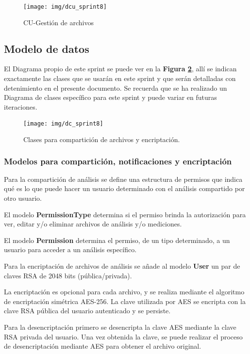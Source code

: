     \begin{figure}[h]
        \centering
        \texttt{[image: img/dcu\_sprint8]}
        \caption{CU-Gestión de archivos}
		\label{8-cu_compartición_encriptación}
    \end{figure}


\subsection{Modelo de datos}
El Diagrama propio de este sprint se puede ver en la \textbf{Figura \ref{8-clases_compartición_encriptación}}, allí se indican exactamente las clases que se usarán en este sprint y que serán detalladas con detenimiento en el presente documento. Se recuerda que se ha realizado un Diagrama de clases específico para este sprint y puede variar en futuras iteraciones.

    \begin{figure}[h]
        \centering
        \texttt{[image: img/dc\_sprint8]}
        \caption{Clases para compartición de archivos y encriptación.}
		\label{8-clases_compartición_encriptación}
    \end{figure}

\subsubsection{Modelos para compartición, notificaciones y encriptación}

Para la compartición de análisis se define una estructura de permisos que indica qué es lo que puede hacer un usuario determinado con el análisis compartido por otro usuario.

El modelo \textbf{PermissionType} determina si el permiso brinda la autorización para ver, editar y/o eliminar archivos de análisis y/o mediciones.

El modelo \textbf{Permission} determina el permiso, de un tipo determinado, a un usuario para acceder a un análisis específico.

Para la encriptación de archivos de análisis se añade al modelo \textbf{User} un par de claves RSA de 2048 bits (pública/privada).

La encriptación es opcional para cada archivo, y se realiza mediante el algoritmo de encriptación simétrica AES-256. La clave utilizada por AES se encripta con la clave RSA pública del usuario autenticado y se persiste.

Para la desencriptación primero se desencripta la clave AES mediante la clave RSA privada del usuario. Una vez obtenida la clave, se puede realizar el proceso de desencriptación mediante AES para obtener el archivo original.

